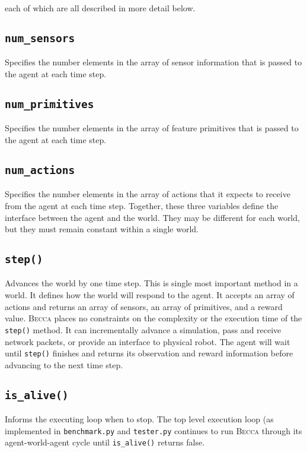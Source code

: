 each of which are all described in more detail below.

\subsection{\texttt{num\_sensors}}
Specifies the number elements in the array of sensor information that is passed to the agent at each time step.

\subsection{\texttt{num\_primitives}}
Specifies the number elements in the array of feature primitives that is passed to the agent at each time step.

\subsection{\texttt{num\_actions}}
Specifies the number elements in the array of actions that it expects to receive from the agent at each time step. Together, these three variables define the interface between the agent and the world. They may be different for each world, but they must remain constant within a single world. 

\subsection{\texttt{step()}}
Advances the world by one time step. This is single most important method in a world. It defines how the world will respond to the agent. It accepts an array of actions and returns an array of sensors, an array of primitives, and a reward value. \textsc{Becca} places no constraints on the complexity or the execution time of the \texttt{step()} method. It can incrementally advance a simulation, pass and receive network packets, or provide an interface to physical robot. The agent will wait until \texttt{step()} finishes and returns its observation and reward information before advancing to the next time step.

\subsection{\texttt{is\_alive()}}
Informs the executing loop when to stop. The top level execution loop (as implemented in \texttt{benchmark.py} and \texttt{tester.py} continues to run \textsc{Becca} through its agent-world-agent cycle until \texttt{is\_alive()} returns false.

